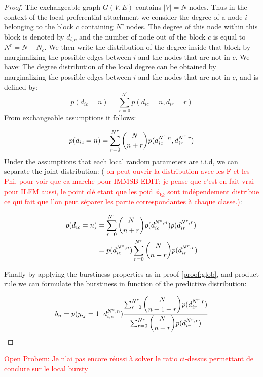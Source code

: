 \begin{proof}
The exchangeable graph $G(V,E)$ contains $|V|=N$ nodes. Thus in the context of the local preferential attachment we consider the degree of a node $i$ belonging to the block $c$ containing $N^c$ nodes. The degree of this node within this block is denoted by $d_{i,c}$ and the  number of node out of the block $c$ is equal to $N^r = N - N_c$. We then write the distribution of the degree inside that block by marginalizing the possible edges between $i$ and the nodes that are not in $c$. We have:
The degree distribution of the local degree can be obtained by marginalizing the possible edges between $i$ and  the nodes that are not in $c$, and is defined by:
\begin{equation}
p(d_{ic}=n) = \sum_{r=0}^{N^r} p(d_{ic}=n,d_{ir}=r)
\end{equation}
From exchangeable assumptions it follows:

\begin{equation}
p(d_{ic}=n) = \sum_{r=0}^{N^r} \dbinom{N}{n+r} p(d_{ic}^{N^c, n},d_{ir}^{N^r, r})
\end{equation}
    Under the assumptions that each local random parameters are i.i.d, we can separate the joint distribution: ( \textcolor{red}{on peut ouvrir la distribution avec les F et les Phi, pour voir que ca marche pour IMMSB EDIT: je pense que c'est en fait vrai pour ILFM aussi, le point clé etant que les poid $\phi_{kk}$ sont indépendement distribue ce qui fait que l'on peut séparer les partie correspondantes à chaque classe.)}: 

\begin{align}
p(d_{ic}=n) &= \sum_{r=0}^{N^r} \dbinom{N}{n+r} p(d_{ic}^{N^c, n}) p(d_{ir}^{N^r, r}) \\
 &=  p(d_{ic}^{N^c, n})\sum_{r=0}^{N^r}   \dbinom{N}{n+r} p(d_{ir}^{N^r, r})
\end{align}

Finally by applying the burstiness properties as in proof \ref{proof:glob}, and product rule we can formulate the burstiness in function of the predictive distribution:

\begin{equation} \label{eq:29}
b_n =  p(y_{ij}=1 | d_{i,c}^{N^c,n}) \frac{\sum_{r=0}^{N^r}\dbinom{N}{n+1+r} p(d_{ir}^{N^r,r})}{\sum_{r=0}^{N^r} \dbinom{N}{n+r} p(d_{ir}^{N^r,r}) }
\end{equation}

\end{proof}

\textcolor{red}{Open Probem:  Je n'ai pas encore réussi à solver le ratio ci-dessus permettant de conclure sur le local bursty}


